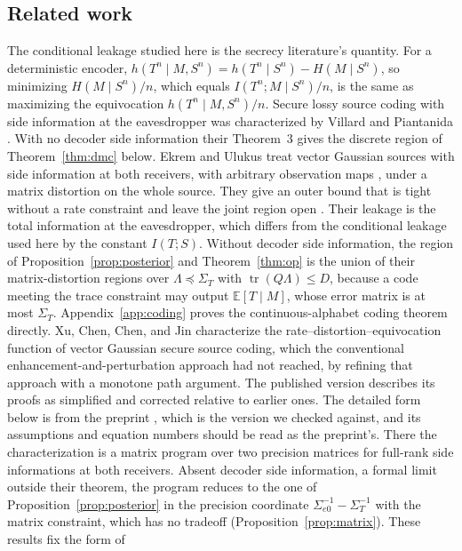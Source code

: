 \documentclass[11pt,onecolumn]{IEEEtran}
\newcommand{\E}{\mathbb{E}}
\newcommand{\tr}{\operatorname{tr}}
\newcommand{\Sez}{\Sigma_{e0}}
\begin{document}
\subsection*{Related work}

The conditional leakage studied here is the secrecy literature's
quantity. For a deterministic encoder,
$h(T^n\mid M,S^n)=h(T^n\mid S^n)-H(M\mid S^n)$, so minimizing
$H(M\mid S^n)/n$, which equals $I(T^n;M\mid S^n)/n$, is the same as
maximizing the equivocation $h(T^n\mid M,S^n)/n$. Secure lossy source
coding with side information at the eavesdropper was characterized by
Villard and Piantanida \cite{villard2013}. With no decoder side
information their Theorem~3 gives the discrete region of
Theorem~\ref{thm:dmc} below. Ekrem and Ulukus \cite{ekrem2013} treat
vector Gaussian sources with side information at both receivers, with
arbitrary observation maps \cite[Sec.~5]{ekrem2013}, under a matrix
distortion on the whole source. They give an outer bound that is tight
without a rate constraint and leave the joint region open
\cite[eqs.~(30)--(31)]{ekrem2013}. Their leakage is the total
information at the eavesdropper, which differs from the conditional
leakage used here by the constant $I(T;S)$. Without decoder side
information, the region of Proposition~\ref{prop:posterior} and
Theorem~\ref{thm:op} is the union of their matrix-distortion regions
over $\Lambda\preceq\Sigma_T$ with $\tr(Q\Lambda)\le D$, because a code
meeting the trace constraint may output $\E[T\mid M]$, whose error
matrix is at most $\Sigma_T$. Appendix~\ref{app:coding} proves the
continuous-alphabet coding theorem directly. Xu, Chen, Chen, and Jin
\cite{xu2024} characterize the rate--distortion--equivocation function of
vector Gaussian secure source coding, which the conventional
enhancement-and-perturbation approach had not reached, by refining that
approach with a monotone path argument. The published version describes
its proofs as simplified and corrected relative to earlier ones. The
detailed form below is from the preprint \cite{xuchen2021}, which is the
version we checked against, and its assumptions and equation numbers
should be read as the preprint's. There the characterization is a matrix
program over two precision matrices \cite[eq.~(189), Thm.~4]{xuchen2021}
for full-rank side informations at both receivers. Absent decoder side information, a formal limit
outside their theorem, the program reduces to the one of
Proposition~\ref{prop:posterior} in the precision coordinate
$\Sez^{-1}-\Sigma_T^{-1}$ with the matrix constraint, which has no
tradeoff (Proposition~\ref{prop:matrix}). These results fix the form of
\end{document}
